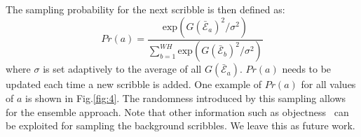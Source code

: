 \documentclass[runningheads]{llncs}
\begin{document}

The sampling probability for the next scribble is then defined as: 
\begin{equation}
  \label{eq:sampling}
  Pr(a) = \frac{\text{exp}(G(\bar{\mathcal{E}}_a)^2 / \sigma^2)} {\sum_{b=1}^{WH} \text{exp} (G(\bar{\mathcal{E}}_b)^2 / \sigma^2)}
\end{equation}
where $\sigma$ is set adaptively to the average of all $G(\bar{\mathcal{E}}_a)$.  
$Pr(a)$ needs to be updated each time a new
scribble is added. One example of $Pr(a)$ for all values of $a$ is shown in Fig.\ref{fig:4}. 
The randomness introduced by this sampling allows for the ensemble approach. Note that other information such
as objectness~\citep{edge:box} can be exploited for sampling the background
scribbles. We leave this as future work.
\end{document}
